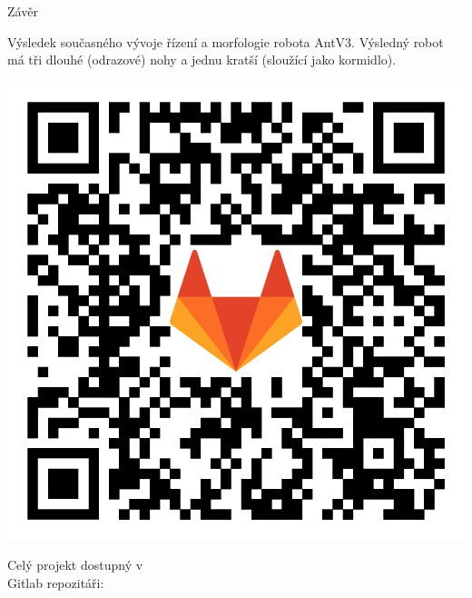 \documentclass[portrait,a0paper,fontscale=0.25]{baposter}
\begin{document}
\begin{poster}
\begin{posterbox}[column=1, name=conclusion, below=result1, bottomaligned=newsomething2]{Závěr}
\begin{center}
    \vspace{5px}
    \scriptsize{Výsledek současného vývoje řízení a morfologie robota
        AntV3. \vspace{2px}\linebreak Výsledný robot má tři dlouhé (odrazové) nohy a jednu kratší (sloužící jako
kormidlo).}
\end{center}


\vspace{-10px}
\begin{center}
    \hspace{100px}
    \includegraphics[width=0.3\linewidth]{../../BP/img/QRGitlab.png}

    \vspace{-57px} %
    \hspace{-110px} %
    Celý projekt dostupný v \\ \hspace{-100px}Gitlab repozitáři:
\end{center}
\end{posterbox}

\end{poster}
\end{document}

